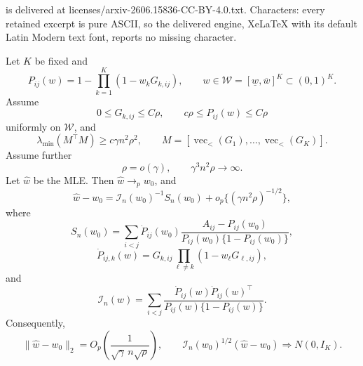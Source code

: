 \documentclass[10pt,a4paper]{amsart}
\providecommand{\calI}{\mathcal I}
\providecommand{\calW}{\mathcal W}
\providecommand{\vecl}{\operatorname{vec}_{<}}
\begin{document}
is delivered at licenses/arxiv-2606.15836-CC-BY-4.0.txt. Characters: every retained excerpt is pure ASCII, so the delivered engine, XeLaTeX with its default Latin Modern text font, reports no missing character.
\begin{theorem}
\label{thm:fixedK-noisyOR-final2}
Let \(K\) be fixed and
\[
  P_{ij}(w)
  =
  1-\prod_{k=1}^K(1-w_kG_{k,ij}),
  \qquad
  w\in\calW=[\underline w,\overline w]^K\subset(0,1)^K.
\]
Assume
\[
  0\le G_{k,ij}\le C\rho,\qquad
  c\rho\le P_{ij}(w)\le C\rho
\]
uniformly on \(\calW\), and
\[
  \lambda_{\min}(M^\top M)\ge c\gamma n^2\rho^2,
  \qquad
  M=[\vecl(G_1),\ldots,\vecl(G_K)].
\]
Assume further
\[
  \rho=o(\gamma),\qquad
  \gamma^3 n^2\rho\to\infty .
\]
Let \(\widehat w\) be the MLE.  Then \(\widehat w\to_p w_0\), and
\[
  \widehat w-w_0
  =
  \calI_n(w_0)^{-1}S_n(w_0)
  +o_p\{(\gamma n^2\rho)^{-1/2}\},
\]
where
\[
  S_n(w_0)
  =
  \sum_{i<j}
  \dot P_{ij}(w_0)
  \frac{A_{ij}-P_{ij}(w_0)}
       {P_{ij}(w_0)\{1-P_{ij}(w_0)\}},
\]
\[
  \dot P_{ij,k}(w)
  =
  G_{k,ij}\prod_{\ell\ne k}(1-w_\ell G_{\ell,ij}),
\]
and
\[
  \calI_n(w)
  =
  \sum_{i<j}
  \frac{\dot P_{ij}(w)\dot P_{ij}(w)^\top}
       {P_{ij}(w)\{1-P_{ij}(w)\}} .
\]
Consequently,
\[
  \|\widehat w-w_0\|_2
  =
  O_p\!\left(\frac1{\sqrt\gamma\,n\sqrt\rho}\right),
  \qquad
  \calI_n(w_0)^{1/2}(\widehat w-w_0)\Rightarrow N(0,I_K).
\]
\end{theorem}
\end{document}
